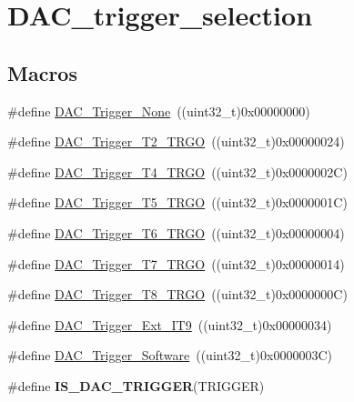 \hypertarget{group___d_a_c__trigger__selection}{\section{D\-A\-C\-\_\-trigger\-\_\-selection}
\label{group___d_a_c__trigger__selection}
}
\subsection*{Macros}
\begin{DoxyCompactItemize}
\item 
\#define \hyperlink{group___d_a_c__trigger__selection_ga7849138e043267668d755390d923e4ba}{D\-A\-C\-\_\-\-Trigger\-\_\-\-None}~((uint32\-\_\-t)0x00000000)
\item 
\#define \hyperlink{group___d_a_c__trigger__selection_ga3bfbff1e03af1fd17a57a43e57420fe6}{D\-A\-C\-\_\-\-Trigger\-\_\-\-T2\-\_\-\-T\-R\-G\-O}~((uint32\-\_\-t)0x00000024)
\item 
\#define \hyperlink{group___d_a_c__trigger__selection_ga58ccb2de3d22d66ee975152f5edb330a}{D\-A\-C\-\_\-\-Trigger\-\_\-\-T4\-\_\-\-T\-R\-G\-O}~((uint32\-\_\-t)0x0000002\-C)
\item 
\#define \hyperlink{group___d_a_c__trigger__selection_ga35352cebfd1ae8a3d63e374a5d86a85d}{D\-A\-C\-\_\-\-Trigger\-\_\-\-T5\-\_\-\-T\-R\-G\-O}~((uint32\-\_\-t)0x0000001\-C)
\item 
\#define \hyperlink{group___d_a_c__trigger__selection_ga083307783678a2f1d3066db57dc84cfe}{D\-A\-C\-\_\-\-Trigger\-\_\-\-T6\-\_\-\-T\-R\-G\-O}~((uint32\-\_\-t)0x00000004)
\item 
\#define \hyperlink{group___d_a_c__trigger__selection_ga9b92d497746be54af46ae4e9c1fc4a6f}{D\-A\-C\-\_\-\-Trigger\-\_\-\-T7\-\_\-\-T\-R\-G\-O}~((uint32\-\_\-t)0x00000014)
\item 
\#define \hyperlink{group___d_a_c__trigger__selection_ga756700c6621eadb807e21a16966580a0}{D\-A\-C\-\_\-\-Trigger\-\_\-\-T8\-\_\-\-T\-R\-G\-O}~((uint32\-\_\-t)0x0000000\-C)
\item 
\#define \hyperlink{group___d_a_c__trigger__selection_ga67c15b2c26246a2304f9db28e25adcc4}{D\-A\-C\-\_\-\-Trigger\-\_\-\-Ext\-\_\-\-I\-T9}~((uint32\-\_\-t)0x00000034)
\item 
\#define \hyperlink{group___d_a_c__trigger__selection_gadef77bb8bbd109232900902402ef637f}{D\-A\-C\-\_\-\-Trigger\-\_\-\-Software}~((uint32\-\_\-t)0x0000003\-C)
\item 
\#define {\bfseries I\-S\-\_\-\-D\-A\-C\-\_\-\-T\-R\-I\-G\-G\-E\-R}(T\-R\-I\-G\-G\-E\-R)
\end{DoxyCompactItemize}


